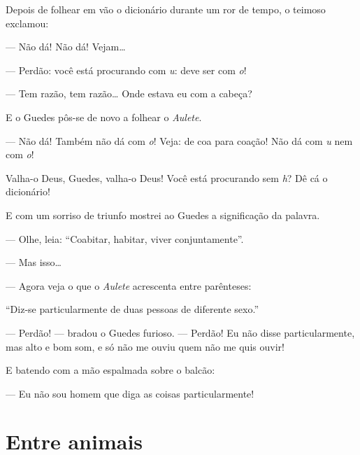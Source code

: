 Depois de folhear em vão o dicionário durante um ror de tempo, o teimoso
exclamou:

--- Não dá! Não dá! Vejam\ldots{}

--- Perdão: você está procurando com \emph{u}: deve ser com \emph{o}!

--- Tem razão, tem razão\ldots{} Onde estava eu com a cabeça?

E o Guedes pôs-se de novo a folhear o \emph{Aulete}.

--- Não dá! Também não dá com \emph{o}! Veja: de coa para coação! Não dá
com \emph{u} nem com \emph{o}!

Valha-o Deus, Guedes, valha-o Deus! Você está procurando sem \emph{h}?
Dê cá o dicionário!

E com um sorriso de triunfo mostrei ao Guedes a significação da palavra.

--- Olhe, leia: ``Coabitar, habitar, viver conjuntamente''.

--- Mas isso\ldots{}

--- Agora veja o que o \emph{Aulete} acrescenta entre parênteses:

``Diz-se particularmente de duas pessoas de diferente sexo.''

--- Perdão! --- bradou o Guedes furioso. --- Perdão! Eu não disse
particularmente, mas alto e bom som, e só não me ouviu quem não me quis
ouvir!

E batendo com a mão espalmada sobre o balcão:

--- Eu não sou homem que diga as coisas particularmente!

\part{Entre animais}

